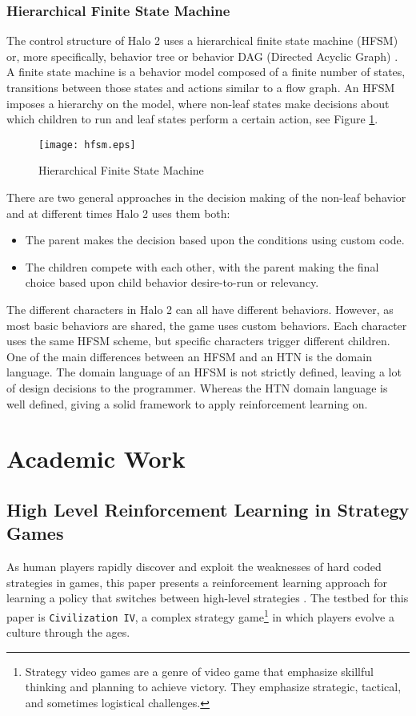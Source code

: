\subsubsection{Hierarchical Finite State Machine}
The control structure of Halo 2 uses a hierarchical finite state machine (HFSM)
or, more specifically, behavior tree or behavior DAG (Directed Acyclic Graph)
\cite{halo3}. A finite state machine is a behavior model composed of a finite
number of states, transitions between those states and actions similar to a
flow graph. An HFSM imposes a hierarchy on the model, where non-leaf states
make decisions about which children to run and leaf states perform a certain
action, see Figure
\ref{fig:hfsm}.
\begin{figure}[!ht]
\centering
\texttt{[image: hfsm.eps]}
\caption{Hierarchical Finite State Machine}
\label{fig:hfsm}
\end{figure}
There are two general approaches in the decision making of the non-leaf
behavior and at different times Halo 2 uses them both:
\begin{itemize}
\item{The parent makes the decision based upon the conditions using custom
code.}
\item{The children compete with each other, with the parent making the final
choice based upon child behavior desire-to-run or relevancy.}
\end{itemize}
The different characters in Halo 2 can all have different behaviors. However,
as most basic behaviors are shared, the game uses custom behaviors. Each
character uses the same HFSM scheme, but specific characters trigger different
children. One of the main differences between an HFSM and an HTN is the domain
language.  The domain language of an HFSM is not strictly defined, leaving a
lot of design decisions to the programmer. Whereas the HTN domain language is
well defined, giving a solid framework to apply reinforcement learning on.

\section{Academic Work}
\subsection{High Level Reinforcement Learning in Strategy Games} 
As human players rapidly discover and exploit the weaknesses of hard coded
strategies in games, this paper presents a reinforcement learning approach for
learning a policy that switches between high-level strategies \cite{rl-rts-1}.
The testbed for this paper is \verb|Civilization IV|, a complex strategy
game\footnote{Strategy video games are a genre of video game that emphasize
skillful thinking and planning to achieve victory. They emphasize strategic,
tactical, and sometimes logistical challenges.} in which players evolve a
culture through the ages.

